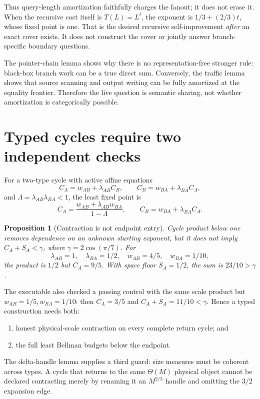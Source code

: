 \documentclass[11pt]{article}
\newtheorem{proposition}[theorem]{Proposition}
\begin{document}
Thus query-length amortization faithfully charges the fanout; it does not
erase it.  When the recursive cost itself is $T(L)=L^t$, the exponent is
$1/3+(2/3)t$, whose fixed point is one.  That is the desired recursive
self-improvement \emph{after} an exact cover exists.  It does not construct
the cover or jointly answer branch-specific boundary questions.

The pointer-chain lemma shows why there is no representation-free stronger
rule: black-box branch work can be a true direct sum.  Conversely, the traffic
lemma shows that source scanning and output writing can be fully amortized at
the equality frontier.  Therefore the live question is semantic sharing, not
whether amortization is categorically possible.

\section{Typed cycles require two independent checks}

For a two-type cycle with active affine equations
\[
 C_A=w_{AB}+\lambda_{AB}C_B,
 \qquad C_B=w_{BA}+\lambda_{BA}C_A,
\]
and $\Lambda=\lambda_{AB}\lambda_{BA}<1$, the least fixed point is
\[
 C_A=\frac{w_{AB}+\lambda_{AB}w_{BA}}{1-\Lambda},
 \qquad C_B=w_{BA}+\lambda_{BA}C_A.
\]

\begin{proposition}[Contraction is not endpoint entry]
Cycle product below one removes dependence on an unknown starting exponent,
but it does not imply $C_A+S_A<\gamma$, where
$\gamma=2\cos(\pi/7)$.  For
\[
 \lambda_{AB}=1,\quad \lambda_{BA}=1/2,\quad
 w_{AB}=4/5,\quad w_{BA}=1/10,
\]
the product is $1/2$ but $C_A=9/5$.  With space floor $S_A=1/2$, the sum is
$23/10>\gamma$.
\end{proposition}

The executable also checked a passing control with the same scale product but
$w_{AB}=1/5,w_{BA}=1/10$: then $C_A=3/5$ and
$C_A+S_A=11/10<\gamma$.  Hence a typed construction needs both:
\begin{enumerate}
\item honest physical-scale contraction on every complete return cycle; and
\item the full least Bellman budgets below the endpoint.
\end{enumerate}

The delta-handle lemma supplies a third guard: size measures must be coherent
across types.  A cycle that returns to the same $\Theta(M)$ physical object
cannot be declared contracting merely by renaming it an $M^{2/3}$ handle and
omitting the $3/2$ expansion edge.
\end{document}
